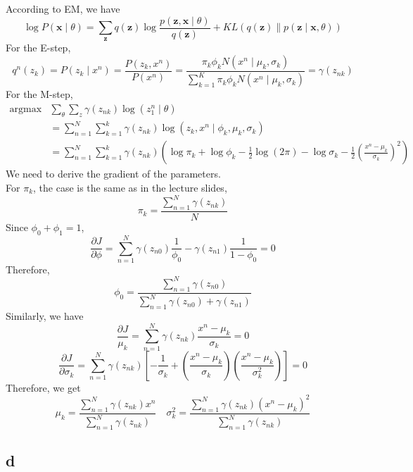 \documentclass{article}
\begin{document}
According to EM, we have
$$
\log P(\boldsymbol{x} \mid \theta)=\sum_{\boldsymbol{z}} q(\boldsymbol{z}) \log \frac{p(\boldsymbol{z}, \boldsymbol{x} \mid \theta)}{q(\boldsymbol{z})}+K L(q(\boldsymbol{z}) \| p(\boldsymbol{z} \mid \boldsymbol{x}, \theta))
$$
For the E-step,
$$
q^{n}\left(z_{k}\right) =P\left(z_{k} \mid x^{n}\right)=\frac{P\left(z_{k}, x^{n}\right)}{P\left(x^{n}\right)} =\frac{\pi_{k} \phi_{k} N\left(x^{n} \mid \mu_{k}, \sigma_{k}\right)}{\sum_{k=1}^{K} \pi_{k} \phi_{k} N\left(x^{n} \mid \mu_{k}, \sigma_{k}\right)}=\gamma\left(z_{n k}\right)
$$
For the M-step,
$$
\begin{aligned}
\operatorname{argmax} & \sum_{\theta} \sum_{z} \gamma\left(z_{n k}\right) \log \left(z_{1}^{n} \mid \theta\right) \\
&=\sum_{n=1}^{N} \sum_{k=1}^{k} \gamma\left(z_{n k}\right) \log \left(z_{k}, x^{n} \mid \phi_{k}, \mu_{k}, \sigma_{k}\right) \\
&=\sum_{n=1}^{N} \sum_{k=1}^{k} \gamma\left(z_{n k}\right)\left(\log \pi_{k}+\log \phi_{k}-\frac{1}{2} \log (2 \pi)-\log \sigma_{k}-\frac{1}{2}\left(\frac{x^{n}-\mu_{k}}{\sigma_{k}}\right)^{2}\right)
\end{aligned}
$$
We need to derive the gradient of the parameters. \\
For $\pi_k$, the case is the same as in the lecture slides,
$$\pi_k = \frac{\sum_{n=1}^{N} \gamma\left(z_{n k}\right)}{N}$$
Since $\phi_0 + \phi_1 = 1$, 
$$
\frac{\partial J}{\partial \phi}=\sum_{n=1}^{N} \gamma\left(z_{n 0}\right) \frac{1}{\phi_{0}}-\gamma\left(z_{n 1}\right) \frac{1}{1-\phi_{0}}=0
$$
Therefore,
$$
\phi_{0}=\frac{\sum_{n=1}^{N} \gamma\left(z_{n 0}\right)}{\sum_{n=1}^{N} \gamma\left(z_{n 0}\right)+\gamma\left(z_{n 1}\right)}
$$
Similarly, we have
$$
\frac{\partial J}{\mu_{k}}=\sum_{n=1}^{N} \gamma\left(z_{n k}\right) \frac{x^{n}-\mu_{k}}{\sigma_{k}}=0
$$
$$
\frac{\partial J}{\partial \sigma_{k}}=\sum_{n=1}^{N} \gamma\left(z_{n k}\right)\left[-\frac{1}{\sigma_{k}}+\left(\frac{x^{n}-\mu_{k}}{\sigma_{k}}\right)\left(\frac{x^{n}-\mu_{k}}{\sigma_{k}^{2}}\right)\right]=0
$$
Therefore, we get
$$
\mu_{k}=\frac{\sum_{n=1}^{N} \gamma\left(z_{n k}\right) x^{n}}{\sum_{n=1}^{N} \gamma\left(z_{n k}\right)} \quad 
\sigma_{k}^{2}=\frac{\sum_{n=1}^{N} \gamma\left(z_{n k}\right)\left(x^{n}-\mu_{k}\right)^{2}}{\sum_{n=1}^{N} \gamma\left(z_{n k}\right)}
$$

\subsection*{d}
\end{document}
